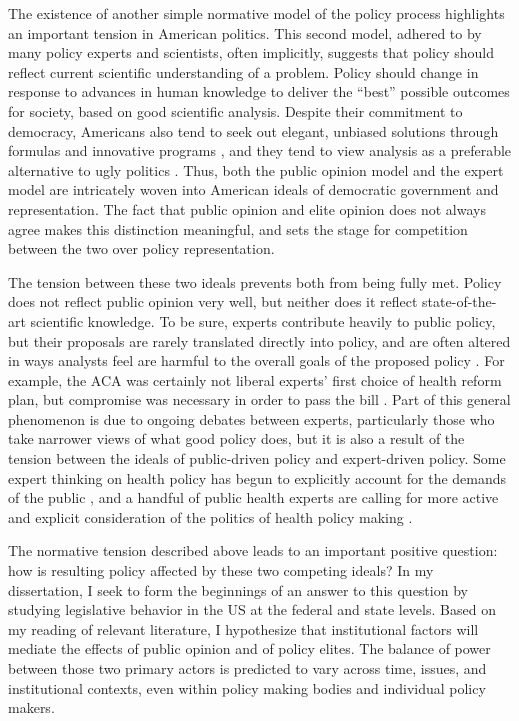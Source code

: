 The existence of another simple normative model of the policy process highlights an important tension in American politics. This second model, adhered to by many policy experts and scientists, often implicitly, suggests that policy should reflect current scientific understanding of a problem. Policy should change in response to advances in human knowledge to deliver the ``best'' possible outcomes for society, based on good scientific analysis. Despite their commitment to democracy, Americans also tend to seek out elegant, unbiased solutions through formulas and innovative programs \citep{Marmor2012b}, and they tend to view analysis as a preferable alternative to ugly politics \citep{Lindblom1965}. Thus, both the public opinion model and the expert model are intricately woven into American ideals of democratic government and representation. The fact that public opinion and elite opinion does not always agree \citep{Smith2002} makes this distinction meaningful, and sets the stage for competition between the two over policy representation.

The tension between these two ideals prevents both from being fully met. Policy does not reflect public opinion very well, but neither does it reflect state-of-the-art scientific knowledge. To be sure, experts contribute heavily to public policy, but their proposals are rarely translated directly into policy, and are often altered in ways analysts feel are harmful to the overall goals of the proposed policy \citep{Oliver2006,Bernier2011}. For example, the ACA was certainly not liberal experts' first choice of health reform plan, but compromise was necessary in order to pass the bill \citep{Oberlander2010}. Part of this general phenomenon is due to ongoing debates between experts, particularly those who take narrower views of what good policy does, but it is also a result of the tension between the ideals of public-driven policy and expert-driven policy. Some expert thinking on health policy has begun to explicitly account for the demands of the public \citep[for example,][]{Kornai2009}, and a handful of public health experts are calling for more active and explicit consideration of the politics of health policy making \citep{Oliver2006,Bernier2011,Navarro2008,Lezine2007}.

The normative tension described above leads to an important positive question: how is resulting policy affected by these two competing ideals? In my dissertation, I seek to form the beginnings of an answer to this question by studying legislative behavior in the US at the federal and state levels. Based on my reading of relevant literature, I hypothesize that institutional factors will mediate the effects of public opinion and of policy elites. The balance of power between those two primary actors is predicted to vary across time, issues, and institutional contexts, even within policy making bodies and individual policy makers.

